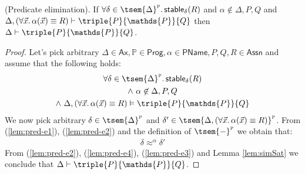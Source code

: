\begin{lem}
	\label{lem:pred-e}
	(Predicate elimination).
	If $\forall \delta \in \tsem{\Delta}^\textsc{p} \ldotp \mathsf{stable}_\delta(R)$ and $\alpha \not\in \Delta, P, Q$ and $\Delta, (\forall \vec{x} \ldotp \alpha(\vec{x}) \equiv R) \vdash \triple{P}{\mathds{P}}{Q}$ then $\Delta \vdash \triple{P}{\mathds{P}}{Q}$.
	\begin{proof}
		Let's pick arbitrary $\Delta \in \mathsf{Ax}, \mathds{P} \in \mathsf{Prog}, \alpha \in \mathsf{PName}, P, Q, R \in \mathsf{Assn}$ and assume that the following holds:
		\begin{gather}
			\label{lem:pred-e1} \forall \delta \in \tsem{\Delta}^\textsc{p} \ldotp \mathsf{stable}_\delta(R) \\
			\label{lem:pred-e2} \land\ \alpha \not\in \Delta, P, Q \\
			\label{lem:pred-e4} \land\ \Delta, (\forall \vec{x} \ldotp \alpha(\vec{x}) \equiv R) \vDash \triple{P}{\mathds{P}}{Q}
		\end{gather}
		We now pick arbitrary $\delta \in \tsem{\Delta}^\textsc{p}$ and $\delta' \in \tsem{\Delta, (\forall \vec{x} \ldotp \alpha(\vec{x}) \equiv R)}^\textsc{p}$. From (\ref{lem:pred-e1}), (\ref{lem:pred-e2}) and the definition of $\tsem{-}^\textsc{p}$ we obtain that:
		\begin{gather}
			\label{lem:pred-e3} \delta \approx^\alpha \delta'
		\end{gather}
		From (\ref{lem:pred-e2}), (\ref{lem:pred-e4}), (\ref{lem:pred-e3}) and Lemma \ref{lem:simSat} we conclude that $\Delta \vdash \triple{P}{\mathds{P}}{Q}$.
	\end{proof}
\end{lem}